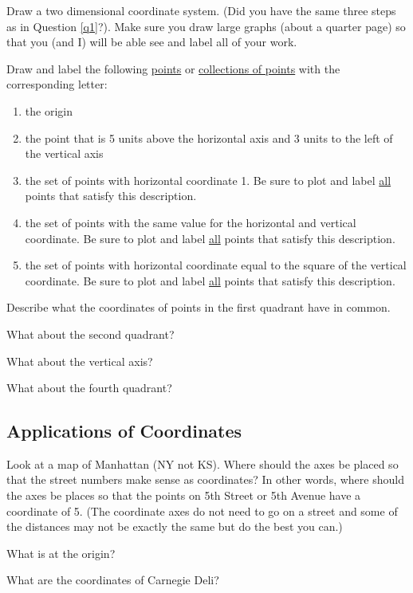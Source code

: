 \bq Draw a two dimensional coordinate system. (Did you have the same three steps as in Question \ref{q1}?). Make sure you draw large graphs (about a quarter page) so that you (and I) will be able see and label all of your work.

Draw and label the following \underline{points} or \underline{collections of points} with the corresponding letter:
\begin{enumerate}
\item the origin
\item the point that is 5 units above the horizontal axis and 3 units to the left of the vertical axis
\item the set of points with horizontal coordinate 1. Be sure to plot and label \underline{all} points that satisfy this description.
\item the set of points with the same value for the horizontal and vertical coordinate. Be sure to plot and label \underline{all} points that satisfy this description.
\item the set of points with horizontal coordinate equal to the square of the vertical coordinate. Be sure to plot and label \underline{all} points that satisfy this description.
\end{enumerate}
\eq

\bq \be
\item Describe what the coordinates of points in the first quadrant have in common.
\item What about the second quadrant?
\item What about the vertical axis?
\item What about the fourth quadrant?
\ee \eq

\subsection{Applications of Coordinates}

\bq \be
\item Look at a map of Manhattan (NY not KS). Where should the axes be placed so that the street numbers make sense as coordinates? In other words, where should the axes be places so that the points on 5th Street or 5th Avenue have a coordinate of 5. (The coordinate axes do not need to go on a street and some of the distances may not be exactly the same but do the best you can.)
\item What is at the origin?
\item What are the coordinates of Carnegie Deli?
\ee \eq

